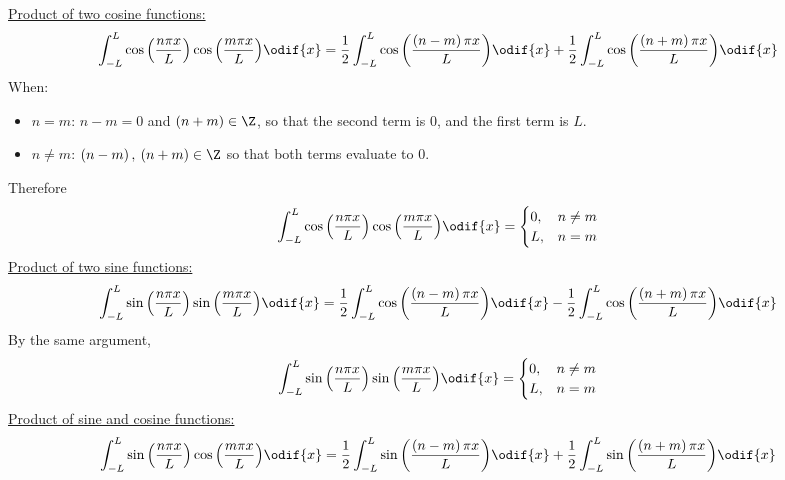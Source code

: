 \documentclass{article}
\begin{document}
\underline{Product of two cosine functions:}
\begin{equation*}
    \int_{-L}^L \cos{\left( \frac{n \pi x}{L} \right)} \cos{\left( \frac{m \pi x}{L} \right)} \odif{x} = \frac{1}{2} \int_{-L}^L \cos{\left( \frac{\left( n - m \right) \pi x}{L} \right)} \odif{x} + \frac{1}{2} \int_{-L}^L \cos{\left( \frac{\left( n + m \right) \pi x}{L} \right)} \odif{x}
\end{equation*}
When:
\begin{itemize}
    \item \(n = m\): \(n - m = 0\) and \(\left( n + m \right) \in \Z\), so that the second
          term is \(0\), and the first term is \(L\).
    \item \(n \neq m\): \(\left( n - m \right),\: \left( n + m \right) \in \Z\) so that both terms evaluate to \(0\).
\end{itemize}
Therefore
\begin{equation*}
    \int_{-L}^L \cos{\left( \frac{n \pi x}{L} \right)} \cos{\left( \frac{m \pi x}{L} \right)} \odif{x} =
    \begin{cases}
        0, & n \neq m \\
        L, & n = m
    \end{cases}
\end{equation*}
\underline{Product of two sine functions:}
\begin{equation*}
    \int_{-L}^L \sin{\left( \frac{n \pi x}{L} \right)} \sin{\left( \frac{m \pi x}{L} \right)} \odif{x} = \frac{1}{2} \int_{-L}^L \cos{\left( \frac{\left( n - m \right) \pi x}{L} \right)} \odif{x} - \frac{1}{2} \int_{-L}^L \cos{\left( \frac{\left( n + m \right) \pi x}{L} \right)} \odif{x}
\end{equation*}
By the same argument,
\begin{equation*}
    \int_{-L}^L \sin{\left( \frac{n \pi x}{L} \right)} \sin{\left( \frac{m \pi x}{L} \right)} \odif{x} =
    \begin{cases}
        0, & n \neq m \\
        L, & n = m
    \end{cases}
\end{equation*}
\underline{Product of sine and cosine functions:}
\begin{equation*}
    \int_{-L}^L \sin{\left( \frac{n \pi x}{L} \right)} \cos{\left( \frac{m \pi x}{L} \right)} \odif{x} = \frac{1}{2} \int_{-L}^L \sin{\left( \frac{\left( n - m \right) \pi x}{L} \right)} \odif{x} + \frac{1}{2} \int_{-L}^L \sin{\left( \frac{\left( n + m \right) \pi x}{L} \right)} \odif{x}
\end{equation*}
\end{document}
